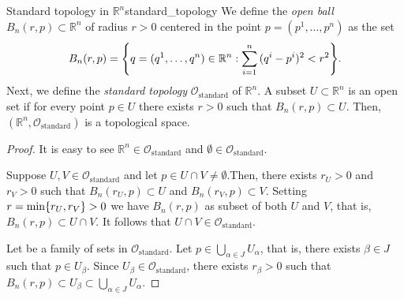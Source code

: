 \begin{proposition}{Standard topology in \(\mathbb{R}^n\)}{standard_topology}
    We define the \emph{open ball} \(B_n(r,p) \subset \mathbb{R}^n\) of radius \(r > 0\) centered in the point \(p = (p^1, \dots, p^n)\) as the set
    \begin{equation*}
        B_n(r, p) = \set*{q = (q^1, \dots, q^n) \in \mathbb{R}^n : \sum_{i=1}^{n}{(q^i - p^i)^2} < r^2}.
    \end{equation*}
    Next, we define the \emph{standard topology} \(\mathcal{O}_\text{standard}\) of \(\mathbb{R}^n\). A subset \(U \subset \mathbb{R}^n\) is an open set if for every point \(p \in U\) there exists \(r > 0\) such that \(B_n(r, p) \subset U\). Then, \((\mathbb{R}^n, \mathcal{O}_\text{standard})\) is a topological space.
\end{proposition}
\begin{proof}
    It is easy to see \(\mathbb{R}^n\in\mathcal{O}_{\text{standard}}\) and \(\emptyset \in \mathcal{O}_{\text{standard}}\).

    Suppose \(U, V \in \mathcal{O}_{\text{standard}}\) and let \(p \in U \cap V \neq \emptyset\).Then, there exists \(r_U > 0\) and \(r_V > 0\) such that \(B_n(r_U, p) \subset U\) and \(B_n(r_V, p) \subset V\). Setting \(r = \min\{r_U, r_V\} > 0\) we have \(B_n(r, p)\) as subset of both \(U\) and \(V\), that is, \(B_n(r, p) \subset U\cap V\). It follows that \(U\cap V\in\mathcal{O}_\text{standard}\).

    Let  be a family of sets in \(\mathcal{O}_\text{standard}\). Let \(p \in \bigcup_{\alpha\in J}U_\alpha\), that is, there exists \(\beta \in J\) such that \(p \in U_\beta\). Since \(U_\beta \in \mathcal{O}_\text{standard}\), there exists \(r_\beta > 0\) such that \(B_n(r, p) \subset U_\beta \subset \bigcup_{\alpha \in J} U_\alpha\).
\end{proof}


